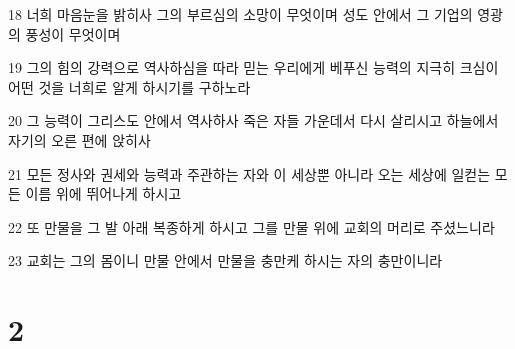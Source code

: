 \par 18 너희 마음눈을 밝히사 그의 부르심의 소망이 무엇이며 성도 안에서 그 기업의 영광의 풍성이 무엇이며
\par 19 그의 힘의 강력으로 역사하심을 따라 믿는 우리에게 베푸신 능력의 지극히 크심이 어떤 것을 너희로 알게 하시기를 구하노라
\par 20 그 능력이 그리스도 안에서 역사하사 죽은 자들 가운데서 다시 살리시고 하늘에서 자기의 오른 편에 앉히사
\par 21 모든 정사와 권세와 능력과 주관하는 자와 이 세상뿐 아니라 오는 세상에 일컫는 모든 이름 위에 뛰어나게 하시고
\par 22 또 만물을 그 발 아래 복종하게 하시고 그를 만물 위에 교회의 머리로 주셨느니라
\par 23 교회는 그의 몸이니 만물 안에서 만물을 충만케 하시는 자의 충만이니라

\chapter{2}

